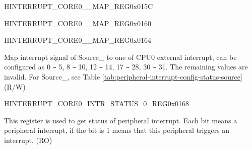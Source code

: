 \begin{register}{H}{INTERRUPT\_CORE0\_\_MAP\_REG}{0x015C}\label{regdesc:INTERRUPTCORE0CORE1PIFPMSMONITORVIOLATESIZEINTRMAPREG}
\end{register}
\vspace{-3em}

\begin{register}{H}{INTERRUPT\_CORE0\_\_MAP\_REG}{0x0160}\label{regdesc:INTERRUPTCORE0CACHECORE0ACSINTMAPREG}
\end{register}
\vspace{-3em}

\begin{register}{H}{INTERRUPT\_CORE0\_\_MAP\_REG}{0x0164}\label{regdesc:INTERRUPTCORE0CACHECORE1ACSINTMAPREG}
%
%
\regnewline%
\begin{regdesc}\begin{reglist}
\label{fielddesc:INTERRUPTCORE0CACHECORE1ACSINTMAP}\item [INTERRUPT\_CORE0\_SOURCE\_\regindex{Y}\_MAP] Map interrupt signal of Source\_ to one of CPU0 external interrupt, can be configured as 0 \verb+~+ 5, 8 \verb+~+ 10, 12 \verb+~+ 14, 17 \verb+~+ 28, 30 \verb+~+ 31. The remaining values are invalid. For Source\_, see Table \ref{tab:peripheral-interrupt-config-status-source} (R/W)
\end{reglist}\end{regdesc}
\end{register}


\begin{register}{H}{INTERRUPT\_CORE0\_INTR\_STATUS\_0\_REG}{0x0168}\label{regdesc:INTERRUPTCORE0INTRSTATUS0REG}
%
\regnewline%
\begin{regdesc}\begin{reglist}
\label{fielddesc:INTERRUPTCORE0INTRSTATUS0}\item [INTERRUPT\_CORE0\_INTR\_STATUS\_0] This register is used to get status of peripheral interrupt. Each bit means a peripheral interrupt, if the bit is 1 means that this peripheral triggers an interrupt. (RO)
\end{reglist}\end{regdesc}
\end{register}


